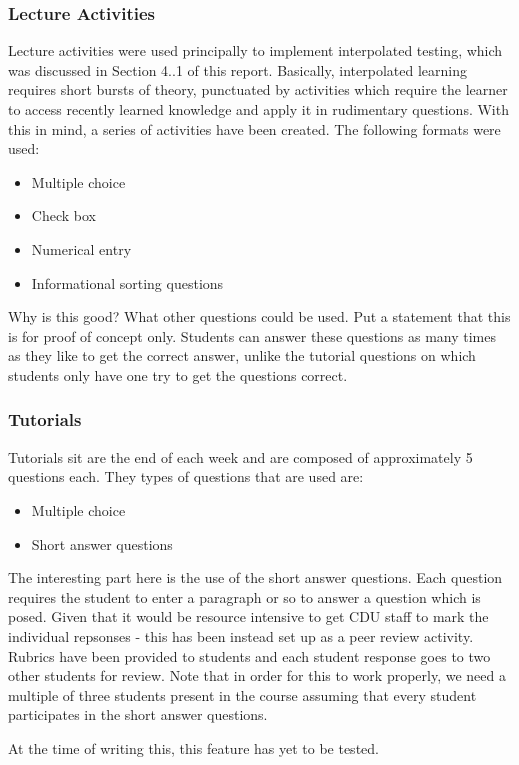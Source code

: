\documentclass[a4paper]{article}
\begin{document}
\subsubsection{Lecture Activities}
Lecture activities were used principally to implement interpolated testing, which was discussed in Section 4..1 of this report. Basically, interpolated learning requires short bursts of theory, punctuated by activities which require the learner to access recently learned knowledge and apply it in rudimentary questions. With this in mind, a series of activities have been created. The following formats were used:
\begin{itemize}
\item Multiple choice
\item Check box
\item Numerical entry
\item Informational sorting questions
\end{itemize}
Why is this good? What other questions could be used. Put a statement that this is for proof of concept only.
Students can answer these questions as many times as they like to get the correct answer, unlike the tutorial questions on which students only have one try to get the questions correct.

\subsubsection{Tutorials}
Tutorials sit are the end of each week and are composed of approximately 5 questions each. They types of questions that are used are:
\begin{itemize}
\item Multiple choice
\item Short answer questions
\end{itemize}
The interesting part here is the use of the short answer questions. Each question requires the student to enter a paragraph or so to answer a question which is posed. Given that it would be resource intensive to get CDU staff to mark the individual repsonses - this has been instead set up as a peer review activity. Rubrics have been provided to students and each student response goes to two other students for review. Note that in order for this to work properly, we need a multiple of three students present in the course assuming that every student participates in the short answer questions. 

At the time of writing this, this feature has yet to be tested.
\end{document}
